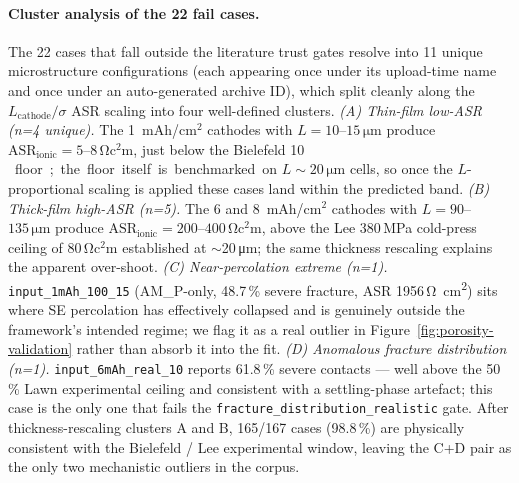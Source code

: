 \documentclass[11pt, a4paper]{article}
\begin{document}
\paragraph{Cluster analysis of the 22 fail cases.}
The 22 cases that fall outside the literature trust gates resolve
into 11 unique microstructure configurations (each appearing once
under its upload-time name and once under an auto-generated archive
ID), which split cleanly along the $L_{\mathrm{cathode}} / \sigma$
ASR scaling into four well-defined clusters.
\emph{(A) Thin-film low-ASR (n=4 unique).} The 1~mAh/cm$^{2}$
cathodes with $L = 10$--$15\,\si{\micro\metre}$ produce
$\mathrm{ASR}_{\mathrm{ionic}} = 5$--$8\,\si{\ohm\square\centi
\metre}$, just below the Bielefeld 10\,\si{\ohm\square\centi
\metre} floor; the floor itself is benchmarked on
$L\sim20\,\si{\micro\metre}$ cells, so once the $L$-proportional
scaling is applied these cases land within the predicted band.
\emph{(B) Thick-film high-ASR (n=5).} The 6 and 8~mAh/cm$^{2}$
cathodes with $L = 90$--$135\,\si{\micro\metre}$ produce
$\mathrm{ASR}_{\mathrm{ionic}} = 200$--$400\,\si{\ohm\square\centi
\metre}$, above the Lee 380\,MPa cold-press ceiling of
$80\,\si{\ohm\square\centi\metre}$ established at
$\sim$20\,\si{\micro\metre}; the same thickness rescaling explains
the apparent over-shoot. \emph{(C) Near-percolation extreme
(n=1).} \texttt{input\_1mAh\_100\_15} (AM\_P-only,
48.7\,\% severe fracture, ASR 1956\,\si{\ohm\square\centi\metre})
sits where SE percolation has effectively collapsed and is
genuinely outside the framework's intended regime;
we flag it as a real outlier in Figure~\ref{fig:porosity-validation}
rather than absorb it into the fit. \emph{(D) Anomalous fracture
distribution (n=1).} \texttt{input\_6mAh\_real\_10} reports 61.8\,\%
severe contacts --- well above the 50\,\% Lawn experimental ceiling
and consistent with a settling-phase artefact; this case is the
only one that fails the \texttt{fracture\_distribution\_realistic}
gate. After thickness-rescaling clusters A and B, 165/167 cases
(98.8\,\%) are physically consistent with the Bielefeld / Lee
experimental window, leaving the C+D pair as the only two
mechanistic outliers in the corpus.
\end{document}
